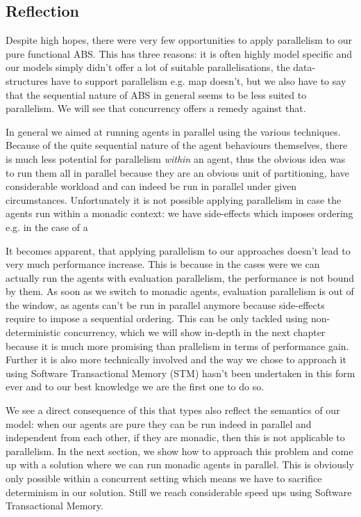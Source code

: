 \subsection{Reflection}
Despite high hopes, there were very few opportunities to apply parallelism to our pure functional ABS. This has three reasons: it is often highly model specific and our models simply didn't offer a lot of suitable parallelisations, the data-structures have to support parallelism e.g. map doesn't, but we also have to say that the sequential nature of ABS in general seems to be less suited to parallelism. We will see that concurrency offers a remedy against that.

In general we aimed at running agents in parallel using the various techniques. Because of the quite sequential nature of the agent behaviours themselves, there is much less potential for parallelism \textit{within} an agent, thus the obvious idea was to run them all in parallel because they are an obvious unit of partitioning, have considerable workload and can indeed be run in parallel under given circumstances.
Unfortunately it is not possible applying parallelism in case the agents run within a monadic context: we have side-effects which imposes ordering e.g. in the case of a

It becomes apparent, that applying parallelism to our approaches doesn't lead to very much performance increase. This is because in the cases were we can actually run the agents with evaluation parallelism, the performance is not bound by them. As soon as we switch to monadic agents, evaluation parallelism is out of the window, as agents can't be run in parallel anymore because side-effects require to impose a sequential ordering. This can be only tackled using non-deterministic concurrency, which we will show in-depth in the next chapter because it is much more promising than prallelism in terms of performance gain. Further it is also more technically involved and the way we chose to approach it using Software Transactional Memory (STM) hasn't been undertaken in this form ever and to our best knowledge we are the first one to do so.

We see a direct consequence of this that types also reflect the semantics of our model: when our agents are pure they can be run indeed in parallel and independent from each other, if they are monadic, then this is not applicable to parallelism. In the next section, we show how to approach this problem and come up with a solution where we can run monadic agents in parallel. This is obviously only possible within a concurrent setting which means we have to sacrifice determinism in our solution. Still we reach considerable speed ups using Software Transactional Memory.